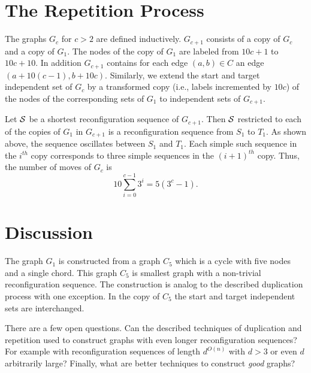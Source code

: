 \documentclass{article}
\begin{document}
\section{The Repetition Process}
The graphs $G_c$ for $c>2$ are defined inductively. $G_{c+1}$ consists
of a copy of $G_c$ and a copy of $G_1$. The nodes of the copy of $G_1$
are labeled from $10c+1$ to $10c+10$. In addition $G_{c+1}$ contains
for each edge $(a,b) \in C$ an edge $(a+10(c-1),b+10c)$. Similarly, we
extend the start and target independent set of $G_c$ by a transformed
copy (i.e., labels incremented by $10c$) of the nodes of the
corresponding sets of $G_1$ to independent sets of $G_{c+1}$.


Let $\cal S$ be a shortest reconfiguration sequence of $G_{c+1}$. Then
$\cal S$ restricted to each of the copies of $G_1$ in $G_{c+1}$ is a
reconfiguration sequence from $S_1$ to $T_1$. As shown above, the
sequence oscillates between $S_1$ and $T_1$. Each simple such
sequence in the $i^{th}$ copy corresponds to three simple sequences in
the $(i+1)^{th}$ copy. Thus, the number of moves of $G_c$ is
\[10\sum_{i=0}^{c-1} 3^i= 5(3^c-1).\]

\section{Discussion}
The graph $G_1$ is constructed from a graph $C_5$ which is a cycle
with five nodes and a single chord. This graph $C_5$ is smallest graph
with a non-trivial reconfiguration sequence. The construction is
analog to the described duplication process with one exception. In the
copy of $C_5$ the start and target independent sets are interchanged.

There are a few open questions. Can the described techniques of
duplication and repetition used to construct graphs with even longer
reconfiguration sequences? For example with reconfiguration sequences
of length $d^{O(n)}$ with $d > 3$ or even $d$ arbitrarily large?
Finally, what are better techniques to construct {\em good} graphs?
\end{document}
